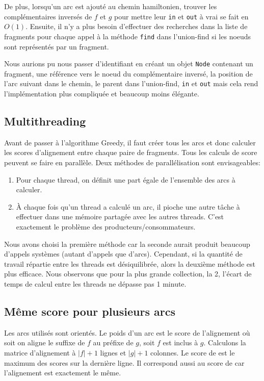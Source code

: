 De plus, lorsqu'un arc  est ajouté au chemin hamiltonien,
trouver les complémentaires inversés de $f$ et $g$ pour mettre
leur \texttt{in} et \texttt{out} à vrai se fait en $O(1)$.
Ensuite, il n'y a plus besoin d'effectuer des recherches dans
la liste de fragments pour chaque appel à la méthode \texttt{find}
dans l'union-find si les noeuds sont représentés par un fragment.

Nous aurions pu nous passer d'identifiant en créant un objet \texttt{Node}
contenant un fragment, une référence vers le noeud du complémentaire inversé,
la position de l'arc suivant dans le chemin,
le parent dans l'union-find, \texttt{in} et \texttt{out} mais
cela rend l'implémentation plus compliquée et beaucoup moins élégante.

\subsection{Multithreading}\label{multithreading}
Avant de passer à l'algorithme Greedy, il faut créer tous les arcs et donc
calculer les scores d'alignement entre chaque paire de fragments.
Tous les calculs de score peuvent se faire en parallèle.
Deux méthodes de parallélisation sont envisageables:
\begin{enumerate}
\item Pour chaque thread, on définit une part égale de l'ensemble des arcs à calculer.
\item À chaque fois qu'un thread a calculé un arc, il pioche une autre tâche à
	effectuer dans une mémoire partagée avec les autres threads.
	C'est exactement le problème des producteurs/consommateurs. %
\end{enumerate}
Nous avons choisi la première méthode car la seconde aurait produit beaucoup d'appels systèmes (autant d'appels que d'arcs).
Cependant, si la quantité de travail répartie entre les threads est désiquilibrée, alors la deuxième méthode est plus efficace.
Nous observons que pour la plus grande collection, la 2, l'écart de temps de calcul entre les threads ne dépasse pas 1 minute.

\subsection{Même score pour plusieurs arcs}\label{sec:1m4s}
Les arcs utilisés sont orientés. Le poids d'un arc  est
le score de l'alignement où soit on aligne le suffixe de $f$ au préfixe de $g$,
soit $f$ est inclus à $g$. Calculons la matrice d'alignement à $|f|+1$ lignes et $|g|+1$ colonnes.
Le score de  est le maximum des scores sur la dernière ligne.
Il correspond aussi au score de  car l'alignement est exactement le même.\\

